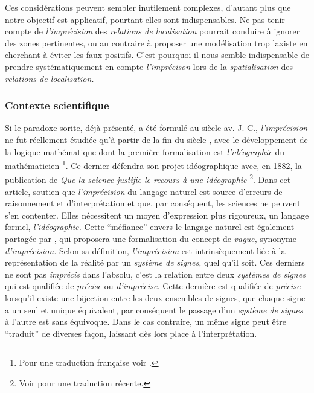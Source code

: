 
Ces considérations peuvent sembler inutilement complexes, d'autant
plus que notre objectif est applicatif, pourtant elles sont
indispensables. Ne pas tenir compte de \emph{l'imprécision} des
\emph{relations de localisation} pourrait conduire à ignorer des zones
pertinentes, ou au contraire à proposer une modélisation trop laxiste
en cherchant à éviter les faux positifs. C'est pourquoi il nous semble
indispensable de prendre systématiquement en compte
\emph{l'imprécison} lors de la \emph{spatialisation} des
\emph{relations de localisation.}

\subsubsection{Contexte scientifique}

Si le paradoxe sorite, déjà présenté, a été formulé au
 siècle av. J.-C., \emph{l'imprécision} ne fut
réellement étudiée qu'à partir de la fin du  siècle
\autocite{Williamson1994}, avec le développement de la logique
mathématique dont la première formalisation est \emph{l'idéographie}
du mathématicien \textcite{Frege1879} \footnote{Pour une traduction
  française voir \textcite{Frege1999}.}. Ce dernier défendra son
projet idéographique avec, en 1882, la publication de \emph{Que la
  science justifie le recours à une idéographie} \autocite{Frege1882}
\footnote{Voir \textcite{Frege2019} pour une traduction
  récente.}. Dans cet article,  soutien que
\emph{l'imprécision} du langage naturel est source d'erreurs de
raisonnement et d'interprétation et que, par conséquent, les sciences
ne peuvent s'en contenter. Elles nécessitent un moyen d'expression
plus rigoureux, un langage formel, \emph{l'idéographie.} Cette
\enquote{méfiance} envers le langage naturel est également partagée
par \textcite{Russell1923}, qui proposera une formalisation du concept
de \emph{vague,} synonyme \emph{d'imprécision.} Selon sa définition,
\emph{l'imprécision} est intrinsèquement liée à la représentation de
la réalité par un \emph{système de signes,} quel qu'il soit. Ces
derniers ne sont pas \emph{imprécis} dans l'absolu, c'est la relation
entre deux \emph{systèmes de signes} qui est qualifiée de
\emph{précise} ou \emph{d'imprécise.} Cette dernière est qualifiée de
\emph{précise} lorsqu'il existe une bijection entre les deux ensembles
de signes, \ie que chaque signe a un seul et unique équivalent, par
conséquent le passage d'un \emph{système de signes} à l'autre est sans
équivoque. Dans le cas contraire, un même signe peut être
\enquote{traduit} de diverses façon, laissant dès lors place à
l'interprétation.

